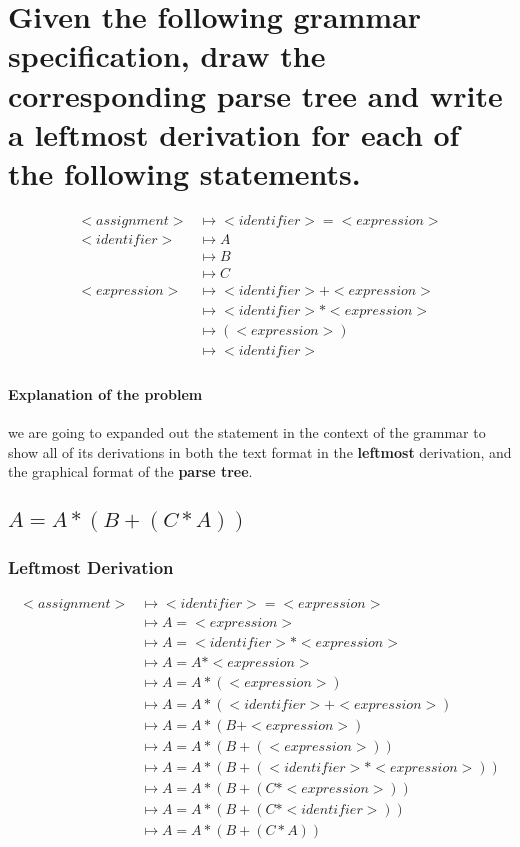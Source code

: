 \section{Given the following grammar specification, draw the corresponding parse tree and write a leftmost derivation for each of the following statements.}
\begin{align*}
<assignment> &\mapsto <identifier> = <expression> \\
<identifier> &\mapsto A \\ 
&\mapsto B \\ 
&\mapsto C \\ 
<expression> &\mapsto <identifier> + <expression> \\
&\mapsto <identifier> * <expression> \\
&\mapsto (<expression>) \\
&\mapsto <identifier> \\
\end{align*}
\paragraph{Explanation of the problem}
we are going to expanded out the statement in the context of the grammar to show all of its derivations in both the text format in the \textbf{leftmost} derivation, and the graphical format of the \textbf{parse tree}. 
\subsection{\(A=A*(B+(C*A))\)}
\subsubsection{Leftmost Derivation}
\begin{align*}
<assignment> &\mapsto <identifier> = <expression> \\
&\mapsto A = <expression> \\
&\mapsto A = <identifier> * <expression> \\
&\mapsto A = A * <expression> \\
&\mapsto A = A * (<expression>) \\
&\mapsto A = A * (<identifier> + <expression>)\\
&\mapsto A = A * (B + <expression>)\\
&\mapsto A = A * (B + (<expression>))\\
&\mapsto A = A * (B + (<identifier> * <expression>))\\
&\mapsto A = A * (B + (C * <expression>))\\
&\mapsto A = A * (B + (C * <identifier>))\\
&\mapsto A = A * (B + (C * A))\\
\end{align*}

